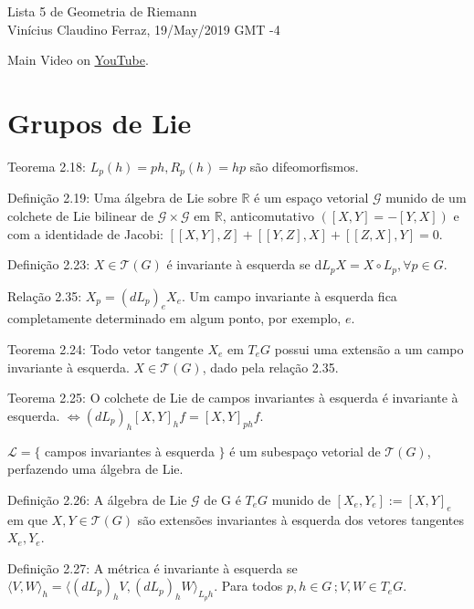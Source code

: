 \documentclass[12pt]{article}
\begin{document}
	\Large

	\begin{center}
	 Lista 5 de Geometria de Riemann \\
	 Vin\'icius Claudino Ferraz, 19/May/2019 GMT -4
	\end{center}

	\normalsize

	Main Video on \href{https://www.youtube.com/watch?v=Z3IXeWvEEa4}{\color{blue}\underline{YouTube}}.

		\section{Grupos de Lie}
		\begin{flushright}
		\end{flushright}

		Teorema 2.18: $L_p(h) = ph, R_p(h) = hp$ s\~ao difeomorfismos.

		Defini\c{c}\~ao 2.19: Uma \'algebra de Lie sobre $\mathbb{R}$ \'e um espa\c{c}o vetorial $\mathcal{G}$ munido de um colchete de Lie bilinear de $\mathcal{G} \times \mathcal{G}$ em $\mathbb{R}$, anticomutativo $([X,Y] = -[Y,X])$ e com a identidade de Jacobi: $[[X,Y], Z] + [[Y,Z],X] + [[Z,X],Y] = 0$.

		Defini\c{c}\~ao 2.23: $X \in \mathcal{T}(G)$ \'e invariante \`a esquerda se d$L_p X = X \circ L_p, \forall p \in G$.

		Rela\c{c}\~ao 2.35: $X_p = (dL_p)_e X_e$. Um campo invariante \`a esquerda fica completamente determinado em algum ponto, por exemplo, $e$.

		Teorema 2.24: Todo vetor tangente $X_e$ em $T_eG$ possui uma extens\~ao a um campo invariante \`a esquerda. $X \in \mathcal{T}(G)$, dado pela rela\c{c}\~ao 2.35.

		Teorema 2.25: O colchete de Lie de campos invariantes \`a esquerda \'e invariante \`a esquerda. $\Leftrightarrow (dL_p)_h [X,Y]_h f = [X,Y]_{ph} f$.

		$\mathcal{L} = \{$ campos invariantes \`a esquerda $\}$ \'e um subespa\c{c}o vetorial de $\mathcal{T}(G)$, perfazendo uma \'algebra de Lie.

		Defini\c{c}\~ao 2.26: A \'algebra de Lie $\mathcal{G}$ de G \'e $T_eG$ munido de $[X_e, Y_e] := [X,Y]_e$ em que $X, Y \in \mathcal{T}(G)$ s\~ao extens\~oes invariantes \`a esquerda dos vetores tangentes $X_e, Y_e$.

		Defini\c{c}\~ao 2.27: A m\'etrica \'e invariante \`a esquerda se $\langle V, W \rangle_h = \langle (dL_p)_h V, (dL_p)_h W \rangle_{L_p h}$. Para todos $p,h \in G\,; V, W \in T_eG$.
\end{document}
